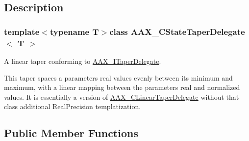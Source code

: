 \subsection{Description}
\subsubsection*{template$<$typename T$>$class A\+A\+X\+\_\+\+C\+State\+Taper\+Delegate$<$ T $>$}

A linear taper conforming to \hyperlink{a00114}{A\+A\+X\+\_\+\+I\+Taper\+Delegate}. 

This taper spaces a parameter\textquotesingle{}s real values evenly between its minimum and maximum, with a linear mapping between the parameter\textquotesingle{}s real and normalized values. It is essentially a version of \hyperlink{a00022}{A\+A\+X\+\_\+\+C\+Linear\+Taper\+Delegate} without that class\textquotesingle{} additional Real\+Precision templatization. \subsection*{Public Member Functions}
